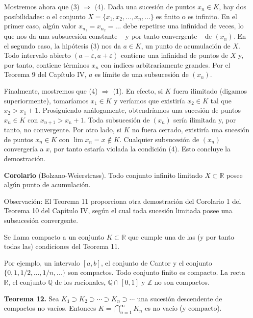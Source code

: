\documentclass[12pt,oneside]{book}
\begin{document}
Mostremos ahora que (3) \(\Rightarrow\) (4). Dada una sucesión de puntos \(x_n \in K\), hay dos posibilidades: o el conjunto \(X = \{x_1, x_2, \dots, x_n, \dots\}\) es finito o es infinito. En el primer caso, algún valor \(x_{n_1} = x_{n_2} = \dots\) debe repetirse una infinidad de veces, lo que nos da una subsucesión constante – y por tanto convergente – de \((x_n)\). En el segundo caso, la hipótesis (3) nos da \(a \in K\), un punto de acumulación de \(X\). Todo intervalo abierto \((a - \varepsilon, a + \varepsilon)\) contiene una infinidad de puntos de \(X\) y, por tanto, contiene términos \(x_n\) con índices arbitrariamente grandes. Por el Teorema 9 del Capítulo IV, \(a\) es límite de una subsucesión de \((x_n)\).

Finalmente, mostremos que (4) \(\Rightarrow\) (1). En efecto, si \(K\) fuera ilimitado (digamos superiormente), tomaríamos \(x_1 \in K\) y veríamos que existiría \(x_2 \in K\) tal que \(x_2 > x_1 + 1\). Prosiguiendo análogamente, obtendríamos una sucesión de puntos \(x_n \in K\) con \(x_{n+1} > x_n + 1\). Toda subsucesión de \((x_n)\) sería ilimitada y, por tanto, no convergente. Por otro lado, si \(K\) no fuera cerrado, existiría una sucesión de puntos \(x_n \in K\) con \(\lim x_n = x \notin K\). Cualquier subsucesión de \((x_n)\) convergería a \(x\), por tanto estaría violada la condición (4). Esto concluye la demostración.

\textbf{Corolario} (Bolzano-Weierstrass). Todo conjunto infinito limitado \(X \subset \mathbb{R}\) posee algún punto de acumulación.

Observación: El Teorema 11 proporciona otra demostración del Corolario 1 del Teorema 10 del Capítulo IV, según el cual toda sucesión limitada posee una subsucesión convergente.

Se llama compacto a un conjunto \(K \subset \mathbb{R}\) que cumple una de las (y por tanto todas las) condiciones del Teorema 11.

Por ejemplo, un intervalo \([a, b]\), el conjunto de Cantor y el conjunto \(\{0, 1, 1/2, \dots, 1/n, \dots\}\) son compactos. Todo conjunto finito es compacto. La recta \(\mathbb{R}\), el conjunto \(\mathbb{Q}\) de los racionales, \(\mathbb{Q} \cap [0, 1]\) y \(\mathbb{Z}\) no son compactos.

\textbf{Teorema 12.} Sea \(K_1 \supset K_2 \supset \cdots \supset K_n \supset \cdots\) una sucesión descendente de compactos no vacíos. Entonces \(K = \bigcap_{n=1}^\infty K_n\) es no vacío (y compacto).
\end{document}
